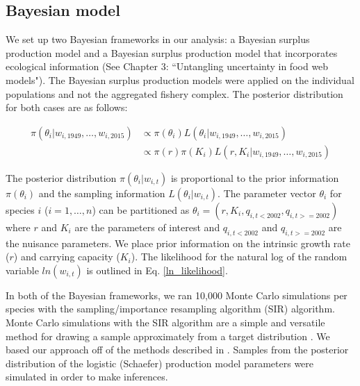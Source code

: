 \documentclass[oneside,12pt,final]{sty/ucthesis-CA2012}
\let\cite\citep                             %
\begin{document}
\begin{mainmatter}
\subsection{Bayesian model}
We set up two Bayesian frameworks in our analysis: a Bayesian surplus production model \cite{mcallister1997bayesian} and a Bayesian surplus production model that incorporates ecological information (See Chapter 3: ``Untangling uncertainty in food web models"). The Bayesian surplus production models were applied on the individual populations and not the aggregated fishery complex. The posterior distribution for both cases are as follows:
 
\begin{align*}
\pi(\theta_i|w_{i,1949},\dots,w_{i,2015}) & \propto \pi(\theta_i)L(\theta_i|w_{i,1949},\dots,w_{i,2015}) \\
& \propto \pi(r)\pi(K_i)L(r,K_i|w_{i,1949},\dots,w_{i,2015})
\end{align*}

The posterior distribution $\pi(\theta_i|w_{i,t})$ is proportional to the prior information $\pi(\theta_i)$ and the sampling information $L(\theta_i|w_{i,t})$. The parameter vector $\theta_i$ for species $i$ ($i=1,\dots,n$) can be partitioned as $\theta_i=(r,K_i,q_{i,t<2002}, q_{i,t>=2002})$ where $r$ and $K_i$ are the parameters of interest and $q_{i,t<2002}$ and $q_{i,t>=2002}$ are the nuisance parameters. We place prior information on the intrinsic growth rate ($r$) and carrying capacity ($K_i$). The likelihood for the natural log of the random variable $ln(w_{i,t})$ is outlined in Eq. \ref{ln_likelihood}.

\vspace{5mm}

In both of the Bayesian frameworks, we ran 10,000 Monte Carlo simulations per species with the sampling/importance resampling algorithm (SIR) algorithm. Monte Carlo simulations with the SIR algorithm are a simple and versatile method for drawing a sample approximately from a target distribution \cite{mcallister1997bayesian, givens2012computational}. We based our approach off of the methods described in \citet{mcallister1997bayesian}. Samples from the posterior distribution of the logistic (Schaefer) production model parameters were simulated in order to make inferences.


\end{mainmatter}
\end{document}
